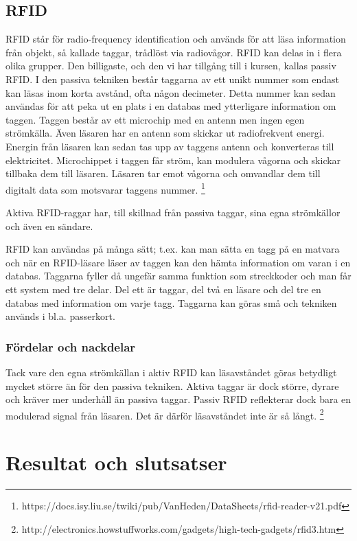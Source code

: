 \documentclass[a4paper,12pt,fleqn]{article}
\begin{document}
\subsection{RFID}
RFID står för radio-frequency identification och används för att läsa information från objekt, så kallade taggar, trådlöst via radiovågor. RFID kan delas in i flera olika grupper. Den billigaste, och den vi har tillgång till i kursen, kallas passiv RFID. I den passiva tekniken består taggarna av ett unikt nummer som endast kan läsas inom korta avstånd, ofta någon decimeter. Detta nummer kan sedan användas för att peka ut en plats i en databas med ytterligare information om taggen. Taggen består av ett microchip med en antenn men ingen egen strömkälla. Även läsaren har en antenn som skickar ut radiofrekvent energi. Energin från läsaren kan sedan tas upp av taggens antenn och konverteras till elektricitet. Microchippet i taggen får ström, kan modulera vågorna och skickar tillbaka dem till läsaren. Läsaren tar emot vågorna och omvandlar dem till digitalt data som motsvarar taggens nummer.
\footnote{https://docs.isy.liu.se/twiki/pub/VanHeden/DataSheets/rfid-reader-v21.pdf}

Aktiva RFID-raggar har, till skillnad från passiva taggar, sina egna strömkällor och även en sändare.

RFID kan användas på många sätt; t.ex. kan man sätta en tagg på en matvara och när en RFID-läsare läser av taggen kan den hämta information om varan i en databas. Taggarna fyller då ungefär samma funktion som streckkoder och man får ett system med tre delar. Del ett är taggar, del två en läsare och del tre en databas med information om varje tagg. Taggarna kan göras små och tekniken används i bl.a. passerkort.

\subsubsection{Fördelar och nackdelar}
Tack vare den egna strömkällan i aktiv RFID kan läsavståndet göras betydligt mycket större än för den passiva tekniken. Aktiva taggar är dock större, dyrare och kräver mer underhåll än passiva taggar. Passiv RFID reflekterar dock bara en modulerad signal från läsaren. Det är därför läsavståndet inte är så långt.
\footnote{http://electronics.howstuffworks.com/gadgets/high-tech-gadgets/rfid3.htm}


\section{Resultat och slutsatser}
\end{document}
